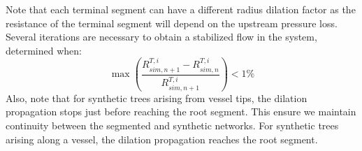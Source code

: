 \documentclass[journal]{IEEEtran}
\newcommand{\clcg}[1]{\textcolor{red}{#1}}
\begin{document}
Note that each terminal segment can have a different radius dilation factor as the resistance of the terminal segment will depend on the upstream pressure loss. 
Several iterations are necessary to obtain a stabilized flow in the system, determined when:
\begin{equation}\label{eq:coron_conv_rest}
\max \left( \frac{R^{T,i}_{sim,n+1} - R^{T,i}_{sim,n}}{R^{T,i}_{sim,n+1}} \right) < 1 \%
\end{equation}
Also, note that for synthetic trees arising from vessel tips, the dilation propagation stops just before reaching the root segment. This ensure we maintain continuity between the segmented and synthetic networks. For synthetic trees arising along a vessel, the dilation propagation reaches the root segment. 

%
%
\end{document}
